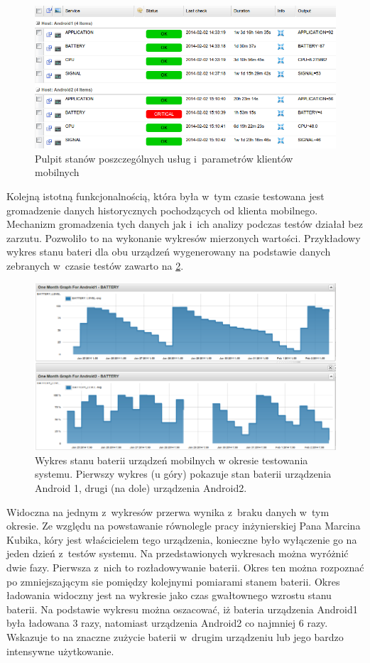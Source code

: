 \begin{figure}[ht]
  \caption{Pulpit stanów poszczególnych usług i~parametrów klientów
    mobilnych}
  \label{fig:criticalBat}
  \centering
\includegraphics[width=1\textwidth]{img/criticalBat.png}
\end{figure}

Kolejną istotną funkcjonalnością, która była w~tym czasie testowana
jest gromadzenie danych historycznych pochodzących od klienta
mobilnego. Mechanizm gromadzenia tych danych jak i~ich analizy podczas
testów działał bez zarzutu. Pozwoliło to na wykonanie wykresów
mierzonych wartości. Przykładowy wykres stanu bateri dla obu urządzeń
wygenerowany na podstawie danych zebranych w~czasie testów zawarto na
\ref{fig:baterie}.
 
\begin{figure}[ht]
  \caption{Wykres stanu baterii urządzeń mobilnych w okresie
    testowania systemu. Pierwszy wykres (u góry) pokazuje stan baterii
    urządzenia Android 1, drugi (na dole) urządzenia Android2.}
  \label{fig:baterie}
  \centering
\includegraphics[width=1\textwidth]{img/battery.png}
\end{figure}

Widoczna na jednym z~wykresów przerwa wynika z~braku danych w~tym
okresie. Ze względu na powstawanie równolegle pracy inżynierskiej Pana
Marcina Kubika, kóry jest właścicielem tego urządzenia, konieczne było
wyłączenie go na jeden dzień z~testów systemu. Na przedstawionych
wykresach można wyróżnić dwie fazy. Pierwsza z~nich to rozładowywanie
baterii. Okres ten można rozpoznać po zmniejszającym sie pomiędzy
kolejnymi pomiarami stanem baterii. Okres ładowania widoczny jest na
wykresie jako czas gwałtownego wzrostu stanu baterii. Na podstawie
wykresu można oszacować, iż bateria urządzenia Android1 była ładowana
3 razy, natomiast urządzenia Android2 co najmniej 6 razy. Wskazuje to
na znaczne zużycie baterii w~drugim urządzeniu lub jego bardzo
intensywne użytkowanie.

